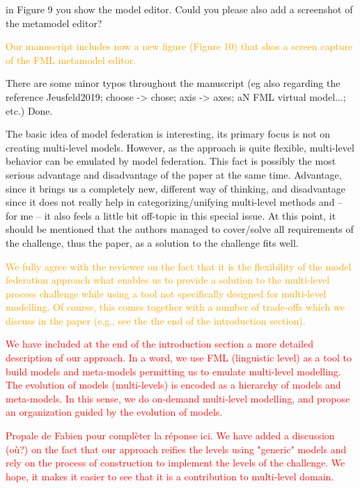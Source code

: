 \documentclass[10pt]{article}
\begin{document}
\begin{response}{in Figure 9 you show the model editor. Could you please also add a screenshot of the metamodel editor?} 

\textcolor{orange}{Our manuscript includes now a new figure (Figure 10) that shos a screen capture of the FML metamodel editor.}
\end{response}

\begin{response}{There are some minor typos throughout the manuscript (eg also regarding the reference Jeusfeld2019; choose -> chose; axis -> axes; aN FML virtual model...; etc.)} 
Done.
\end{response}


\pagebreak


\begin{response}{The basic idea of model federation is interesting, its primary focus is not on creating multi-level models. However, as the approach is quite flexible, multi-level behavior can be emulated by model federation. This fact is possibly the most serious advantage and disadvantage of the paper at the same time. Advantage, since it brings us a completely new, different way of thinking, and disadvantage since it does not really help in categorizing/unifying multi-level methods and -- for me -- it also feels a little bit off-topic in this special issue. At this point, it should be mentioned that the authors managed to cover/solve all requirements of the challenge, thus the paper, as a solution to the challenge fits well.} 

\textcolor{orange}{We fully agree with the reviewer on the fact that it is the flexibility of the model federation approach what enables us to provide a solution to the multi-level process challenge while using a tool not specifically designed for multi-level modelling. Of course, this comes together with a number of trade-offs which we discuss in the paper (e.g., see the the end of the introduction section).}

\textcolor{red}{We have included at the end of the introduction section a more detailed description of our approach. In a word, we use FML (linguistic level) as a tool to build models and meta-models permitting us to emulate multi-level modelling. The evolution of models (multi-levels) is encoded as a hierarchy of models and meta-models. In this sense, we do on-demand multi-level modelling, and propose an organization guided by the evolution of models.}

\textcolor{red}{Propale de Fabien pour complèter la réponse ici. We have added a discussion (où?) on the fact that our approach reifies the levels using "generic" models and rely on the process of construction to implement the levels of the challenge. We hope, it makes it easier to see that it is a contribution to multi-level domain.}

\end{response}
\end{document}
